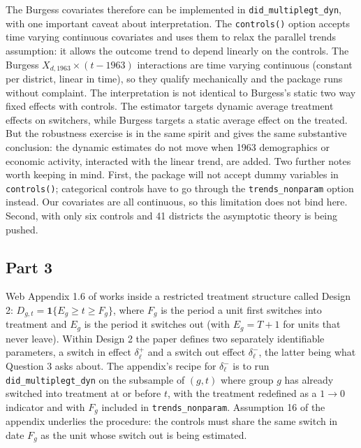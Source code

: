 The Burgess covariates therefore can be implemented in \texttt{did\_multiplegt\_dyn}, with one important caveat about interpretation. The \texttt{controls()} option accepts time varying continuous covariates and uses them to relax the parallel trends assumption: it allows the outcome trend to depend linearly on the controls. The Burgess $X_{d, 1963} \times (t - 1963)$ interactions are time varying continuous (constant per district, linear in time), so they qualify mechanically and the package runs without complaint. The interpretation is not identical to Burgess's static two way fixed effects with controls. The \citet{dCDH2024} estimator targets dynamic average treatment effects on switchers, while Burgess targets a static average effect on the treated. But the robustness exercise is in the same spirit and gives the same substantive conclusion: the dynamic estimates do not move when 1963 demographics or economic activity, interacted with the linear trend, are added. Two further notes worth keeping in mind. First, the package will not accept dummy variables in \texttt{controls()}; categorical controls have to go through the \texttt{trends\_nonparam} option instead. Our covariates are all continuous, so this limitation does not bind here. Second, with only six controls and 41 districts the asymptotic theory is being pushed.

\subsection*{Part 3}

 Web Appendix 1.6 of \citet{dCDH2024} works inside a restricted treatment structure called Design 2: $D_{g,t} = \mathbf{1}\{E_g \ge t \ge F_g\}$, where $F_g$ is the period a unit first switches into treatment and $E_g$ is the period it switches out (with $E_g = T + 1$ for units that never leave). Within Design 2 the paper defines two separately identifiable parameters, a switch in effect $\delta^+_\ell$ and a switch out effect $\delta^-_\ell$, the latter being what Question 3 asks about. The appendix's recipe for $\delta^-_\ell$ is to run \texttt{did\_multiplegt\_dyn} on the subsample of $(g, t)$ where group $g$ has already switched into treatment at or before $t$, with the treatment redefined as a $1 \to 0$ indicator and with $F_g$ included in \texttt{trends\_nonparam}. Assumption 16 of the appendix underlies the procedure: the controls must share the same switch in date $F_g$ as the unit whose switch out is being estimated.\\

